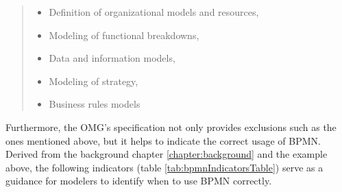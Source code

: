 \begin{quote}

\begin{itemize}
\item Definition of organizational models and resources,
\item Modeling of functional breakdowns,
\item Data and information models,
\item Modeling of strategy,
\item Business rules models
\end{itemize}

\end{quote}


Furthermore, the OMG's specification not only provides exclusions such as the ones mentioned above, but it helps to indicate the correct usage of BPMN. Derived from the background chapter \ref{chapter:background} and the example above, the following indicators (table \ref{tab:bpmnIndicatorsTable}) serve as a guidance for modelers to identify when to use BPMN correctly. 

